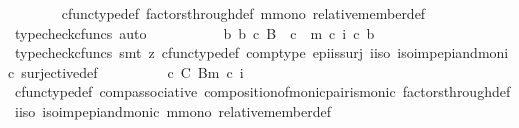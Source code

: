 \begin{isabellebody}
\ \ \ \ \ \ \isamarkupfalse%
\ cfunc{\isacharunderscore}{\kern0pt}type{\isacharunderscore}{\kern0pt}def\ factors{\isacharunderscore}{\kern0pt}through{\isacharunderscore}{\kern0pt}def\ m{\isacharunderscore}{\kern0pt}mono\ relative{\isacharunderscore}{\kern0pt}member{\isacharunderscore}{\kern0pt}def{}\ \isamarkupfalse%
\ {\isacharparenleft}{\kern0pt}typecheck{\isacharunderscore}{\kern0pt}cfuncs{\isacharcomma}{\kern0pt}\ auto{\isacharparenright}{\kern0pt}\isanewline
\ \ \ \ \isamarkupfalse%
\ \isamarkupfalse%
\ {\isachardoublequoteopen}{\isachardot}{\kern0pt}{\isachardot}{\kern0pt}{\isachardot}{\kern0pt}\ {\isacharequal}{\kern0pt}\ {\isacharparenleft}{\kern0pt}{\isasymexists}\ b{\isachardot}{\kern0pt}\ b\ {\isasymin}\isactrlsub c\ B\ {\isasymand}\ c\ {\isacharequal}{\kern0pt}\ m\ {\isasymcirc}\isactrlsub c\ i\ {\isasymcirc}\isactrlsub c\ b{\isacharparenright}{\kern0pt}{\isachardoublequoteclose}\isanewline
\ \ \ \ \ \ \isamarkupfalse%
\ {\isacharparenleft}{\kern0pt}typecheck{\isacharunderscore}{\kern0pt}cfuncs{\isacharcomma}{\kern0pt}\ smt\ {\isacharparenleft}{\kern0pt}z{}{\isacharparenright}{\kern0pt}\ cfunc{\isacharunderscore}{\kern0pt}type{\isacharunderscore}{\kern0pt}def\ comp{\isacharunderscore}{\kern0pt}type\ epi{\isacharunderscore}{\kern0pt}is{\isacharunderscore}{\kern0pt}surj\ i{\isacharunderscore}{\kern0pt}iso\ iso{\isacharunderscore}{\kern0pt}imp{\isacharunderscore}{\kern0pt}epi{\isacharunderscore}{\kern0pt}and{\isacharunderscore}{\kern0pt}monic\ surjective{\isacharunderscore}{\kern0pt}def{\isacharparenright}{\kern0pt}\isanewline
\ \ \ \ \isamarkupfalse%
\ \isamarkupfalse%
\ {\isachardoublequoteopen}{\isachardot}{\kern0pt}{\isachardot}{\kern0pt}{\isachardot}{\kern0pt}\ {\isacharequal}{\kern0pt}\ {\isacharparenleft}{\kern0pt}c\ {\isasymin}\isactrlbsub C\isactrlesub \ {\isacharparenleft}{\kern0pt}B{\isacharcomma}{\kern0pt}m\ {\isasymcirc}\isactrlsub c\ i{\isacharparenright}{\kern0pt}{\isacharparenright}{\kern0pt}{\isachardoublequoteclose}\isanewline
\ \ \ \ \ \ \isamarkupfalse%
\ cfunc{\isacharunderscore}{\kern0pt}type{\isacharunderscore}{\kern0pt}def\ comp{\isacharunderscore}{\kern0pt}associative{}\ composition{\isacharunderscore}{\kern0pt}of{\isacharunderscore}{\kern0pt}monic{\isacharunderscore}{\kern0pt}pair{\isacharunderscore}{\kern0pt}is{\isacharunderscore}{\kern0pt}monic\ factors{\isacharunderscore}{\kern0pt}through{\isacharunderscore}{\kern0pt}def{}\ i{\isacharunderscore}{\kern0pt}iso\ iso{\isacharunderscore}{\kern0pt}imp{\isacharunderscore}{\kern0pt}epi{\isacharunderscore}{\kern0pt}and{\isacharunderscore}{\kern0pt}monic\ m{\isacharunderscore}{\kern0pt}mono\ relative{\isacharunderscore}{\kern0pt}member{\isacharunderscore}{\kern0pt}def{}\isanewline

\end{isabellebody}

